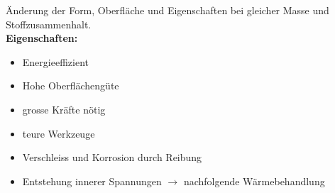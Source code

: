 Änderung der Form, Oberfläche und Eigenschaften bei gleicher Masse und Stoffzusammenhalt.\\

\textbf{Eigenschaften:}\\
\begin{minipage}{0.5\linewidth}
    \begin{itemize}
        \item Energieeffizient
        \item Hohe Oberflächengüte
        \item grosse Kräfte nötig
        \item teure Werkzeuge
    \end{itemize}
\end{minipage}
\begin{minipage}{0.5\linewidth}
    \begin{itemize}
        \item Verschleiss und Korrosion durch Reibung
        \item Entstehung innerer Spannungen $\rightarrow$ nachfolgende Wärmebehandlung
    \end{itemize}
\end{minipage}